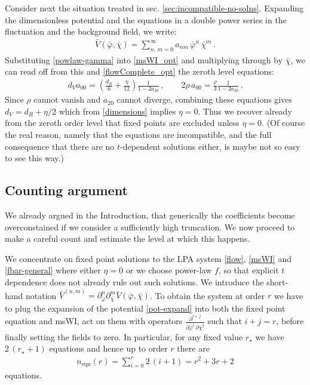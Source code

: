 \documentclass[11pt]{book} %
\newcommand{\bp}{\bar \varphi}
\newcommand{\bc}{\bar \chi}
\numberwithin{equation}{chapter}
\begin{document}
Consider next the situation treated in sec. \ref{sec:incompatible-no-solns}.
Expanding the dimensionless potential and the equations in a double power series in the fluctuation and
the background field, we write:
\begin{align}
  \label{pot-expand}
  \bar V(\bar\varphi,\bar\chi) = \sum_{n,\,m=0}^{\infty} a_{nm} \, \bar\varphi^n \, \bar\chi^m\,.
\end{align}
Substituting \eqref{powlaw-gamma} into \eqref{msWI_opt} and multiplying through by $\bc$,
we can read off from this and \eqref{flowComplete_opt} the zeroth level equations:
\begin{align}
  d_V a_{00} = \left(  \frac{d_R}{6} + \frac{\eta}{12} \right) \frac{1}{1 -  2a_{20}}\,,\qquad 2\rho\, a_{00} = \frac{\rho}{3} \frac{1}{1 -  2a_{20}}\,.
\end{align}
Since $\rho$ cannot vanish and $a_{20}$ cannot diverge,
combining these equations gives $d_V = d_R+\eta/2$ which from \eqref{dimensions} implies $\eta=0$.
Thus we recover already from the zeroth order level that fixed points are excluded unless $\eta=0$.
(Of course the real reason, namely that the equations are incompatible,
and the full consequence that there are no $t$-dependent solutions either,
is maybe not so easy to see this way.)


\subsection{Counting argument}\label{sec:counting}

We already argued in the Introduction, that generically the coefficients become overconstained if we
consider a sufficiently high truncation. We now proceed to make a careful count and estimate the
level at which this happens.

We concentrate on fixed point solutions to the LPA system \eqref{flow},
\eqref{msWI} and \eqref{fbar-general} where either $\eta=0$ or we choose power-law $f$,
so that explicit $t$ dependence does not already rule out such solutions.
We introduce the short-hand notation
$\bar V ^{(n,m)}=\partial_{\bar \varphi}^n \partial_{\bar \chi}^m \bar V(\bp,\bc)$.
To obtain the system at order $r$ we have to plug the expansion of the potential \eqref{pot-expand}
into both the fixed point equation and msWI, act on them with operators
$\frac{\partial^{i+j}}{\partial \bar\varphi^i \, \partial \bar\chi^j}$ such that $i+j=r$,
before finally setting the fields to zero.
In particular, for any fixed value $r_{\star}$ we have $2 \, (r_{\star}+1)$ equations
and hence up to order $r$ there are
\begin{align}
  \label{number_eqns}
  n_{\text{eqn}}(r) = \sum_{i=0}^{r} 2\,(i+1) = r^2 + 3r + 2
\end{align}
equations.
\end{document}

